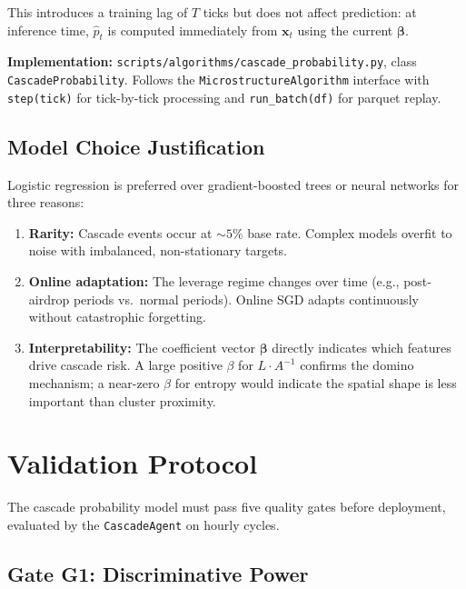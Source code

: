 \documentclass[11pt,a4paper]{article}
\begin{document}
This introduces a training lag of $T$ ticks but does not affect prediction: at inference time, $\hat{p}_t$ is computed immediately from $\mathbf{x}_t$ using the current $\boldsymbol{\beta}$.

\textbf{Implementation:} \texttt{scripts/algorithms/cascade\_probability.py}, class \texttt{CascadeProbability}. Follows the \texttt{MicrostructureAlgorithm} interface with \texttt{step(tick)} for tick-by-tick processing and \texttt{run\_batch(df)} for parquet replay.

\subsection{Model Choice Justification}

Logistic regression is preferred over gradient-boosted trees or neural networks for three reasons:

\begin{enumerate}
    \item \textbf{Rarity:} Cascade events occur at $\sim 5\%$ base rate. Complex models overfit to noise with imbalanced, non-stationary targets.
    \item \textbf{Online adaptation:} The leverage regime changes over time (e.g., post-airdrop periods vs.\ normal periods). Online SGD adapts continuously without catastrophic forgetting.
    \item \textbf{Interpretability:} The coefficient vector $\boldsymbol{\beta}$ directly indicates which features drive cascade risk. A large positive $\beta$ for $L \cdot A^{-1}$ confirms the domino mechanism; a near-zero $\beta$ for entropy would indicate the spatial shape is less important than cluster proximity.
\end{enumerate}

\section{Validation Protocol}
\label{sec:validation}

The cascade probability model must pass five quality gates before deployment, evaluated by the \texttt{CascadeAgent} on hourly cycles.

\subsection{Gate G1: Discriminative Power}
\end{document}
